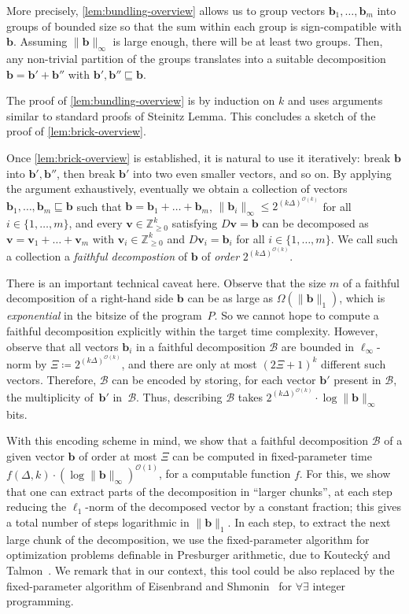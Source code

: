 \documentclass{article}
\renewcommand{\leq}{\leqslant}
\renewcommand{\geq}{\geqslant}
\newcommand{\cfleq}{\sqsubseteq}
\newcommand{\Bb}{\mathcal{B}}
\newcommand{\Z}{\mathbb{Z}}
\newcommand{\Zn}{\Z_{\geq 0}}
\newcommand{\tup}[1]{{\mathbf{#1}}}
\newcommand{\bb}{\tup b}
\newcommand{\myvv}{\tup v} %
\newcommand{\Oh}{{\mathcal{O}}}
\begin{document}
More precisely, \cref{lem:bundling-overview} allows us to group vectors $\bb_1,\ldots,\bb_m$ into groups of bounded size so that the sum within each group is sign-compatible with $\bb$. Assuming $\|\bb\|_\infty$ is large enough, there will be at least two groups. Then, any non-trivial partition of the groups translates into a suitable decomposition $\bb=\bb'+\bb''$ with $\bb',\bb''\cfleq \bb$.

The proof of \cref{lem:bundling-overview} is by induction on $k$ and uses arguments similar to standard proofs of Steinitz Lemma. This concludes a sketch of the proof of \cref{lem:brick-overview}.
\medskip

Once \cref{lem:brick-overview} is established, it is natural to use it iteratively: break $\bb$ into $\bb',\bb''$, then break $\bb'$ into two even smaller vectors, and so on. By applying the argument exhaustively, eventually we obtain a collection of vectors $\bb_1,\ldots,\bb_m\cfleq \bb$ such that $\bb=\bb_1+\ldots+\bb_m$,  $\|\bb_i\|_\infty\leq 2^{(k\Delta)^{\Oh(k)}}$ for all $i\in \{1,\ldots,m\}$, and every $\myvv\in \Zn^k$ satisfying $D\myvv=\bb$ can be decomposed as $\myvv=\myvv_1+\ldots+\myvv_m$ with $\myvv_i\in \Zn^k$ and $D\myvv_i=\bb_i$ for all $i\in \{1,\ldots,m\}$. We call such a collection a {\em{faithful decompostion}} of $\bb$ of {\em{order}} $2^{(k\Delta)^{\Oh(k)}}$.

There is an important technical caveat here. Observe that the size $m$ of a faithful decomposition of a right-hand side $\bb$ can be as large as $\Omega(\|\bb\|_1)$, which is {\em{exponential}} in the bitsize of the program~$P$. So we cannot hope to compute a faithful decomposition explicitly within the target time complexity. However, observe that all vectors $\bb_i$ in a faithful decomposition $\Bb$ are bounded in $\ell_\infty$-norm by $\Xi\coloneqq 2^{(k\Delta)^{\Oh(k)}}$, and there are only at most $(2\Xi+1)^k$ different such vectors. Therefore, $\Bb$ can be encoded by storing, for each vector $\bb'$ present in $\Bb$, the multiplicity of~$\bb'$ in~$\Bb$. Thus, describing $\Bb$ takes $2^{(k\Delta)^{\Oh(k)}}\cdot \log \|\bb\|_\infty$ bits.

With this encoding scheme in mind, we show that a faithful decomposition $\Bb$ of a given vector $\bb$ of order at most $\Xi$ can be computed in fixed-parameter time $f(\Delta,k)\cdot (\log \|\bb\|_\infty)^{\Oh(1)}$, for a computable function $f$. For this, we show that one can extract parts of the decomposition in ``larger chunks'', at each step reducing the $\ell_1$-norm of the decomposed vector by a constant fraction; this gives a total number of steps logarithmic in $\|\bb\|_1$. In each step, to extract the next large chunk of the decomposition, we use the fixed-parameter algorithm for optimization problems definable in Presburger arithmetic, due to Kouteck\'y and Talmon~\cite{KouteckyT21}. We remark that in our context, this tool could be also replaced by the fixed-parameter algorithm of Eisenbrand and Shmonin~\cite{DBLP:journals/mor/EisenbrandS08} for $\forall\exists$ integer programming.
\end{document}
